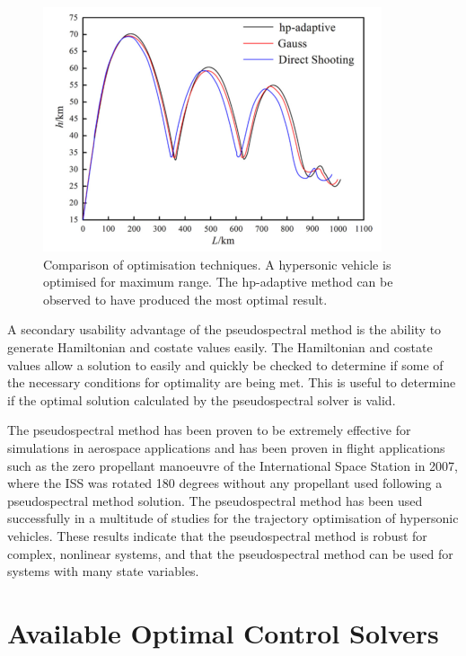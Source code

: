 \begin{figure}[ht]
	\centering
	\includegraphics[width=0.7\linewidth]{figures/2_literature-review/OptimisationMethodComparisonChai}
	\caption{Comparison of optimisation techniques\cite{Chai2015}. A hypersonic vehicle is optimised for maximum range. The \textsf{hp}-adaptive method can be observed to have produced the most optimal result.}
	\label{fig:OptimisationMethodComparisonChai}
\end{figure}

A secondary usability advantage of the pseudospectral method is the ability to generate Hamiltonian and costate values easily\cite{Gong2010,Fahroo2001,Rao2009}. The Hamiltonian and costate values allow a solution to easily and quickly be checked to determine if some of the necessary conditions for optimality are being met. This is useful to determine if the optimal solution calculated by the pseudospectral solver is valid.


The pseudospectral method has been proven to be extremely effective for simulations in aerospace applications and has been proven in flight applications such as the zero propellant manoeuvre of the International Space Station in 2007, where the ISS was rotated 180 degrees without any propellant used following a pseudospectral method solution\cite{Bedrossian}. 
The pseudospectral method has been used successfully in a multitude of studies for the trajectory optimisation of hypersonic vehicles\cite{Li2012,Josselyn2002a,Zhao2013,Tian2011,Darby2011,Chai2015,Rizvi2015,Moshman2014,Yang2017,Kodera2014}. 
These results indicate that the pseudospectral method is robust for complex, nonlinear systems, and that the pseudospectral method can be used for systems with many state variables.


\section{Available Optimal Control Solvers}\label{sec:optsolvers}

